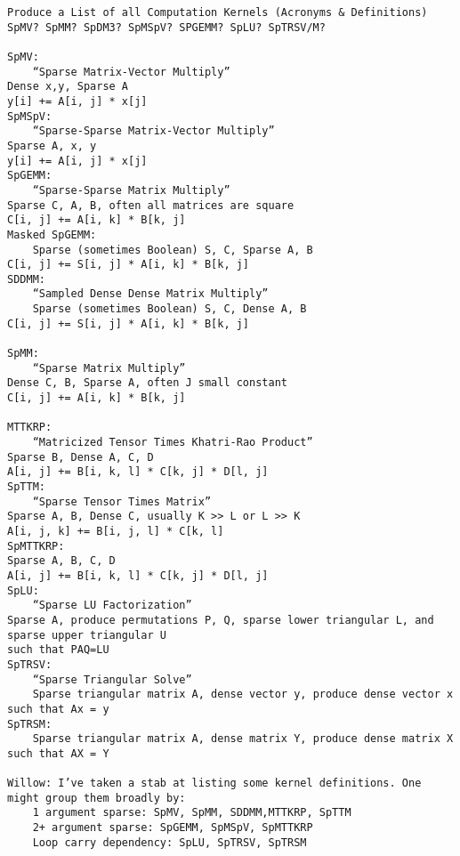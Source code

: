 \documentclass{article}
\begin{document}
\begin{verbatim}
Produce a List of all Computation Kernels (Acronyms & Definitions)
SpMV? SpMM? SpDM3? SpMSpV? SPGEMM? SpLU? SpTRSV/M?

SpMV:
	“Sparse Matrix-Vector Multiply”
Dense x,y, Sparse A
y[i] += A[i, j] * x[j]
SpMSpV:
	“Sparse-Sparse Matrix-Vector Multiply”
Sparse A, x, y
y[i] += A[i, j] * x[j]
SpGEMM:
	“Sparse-Sparse Matrix Multiply”
Sparse C, A, B, often all matrices are square
C[i, j] += A[i, k] * B[k, j]
Masked SpGEMM:
	Sparse (sometimes Boolean) S, C, Sparse A, B
C[i, j] += S[i, j] * A[i, k] * B[k, j]
SDDMM:
	“Sampled Dense Dense Matrix Multiply”
	Sparse (sometimes Boolean) S, C, Dense A, B
C[i, j] += S[i, j] * A[i, k] * B[k, j]

SpMM:
	“Sparse Matrix Multiply”
Dense C, B, Sparse A, often J small constant
C[i, j] += A[i, k] * B[k, j]

MTTKRP:
	“Matricized Tensor Times Khatri-Rao Product”
Sparse B, Dense A, C, D
A[i, j] += B[i, k, l] * C[k, j] * D[l, j]
SpTTM:
	“Sparse Tensor Times Matrix”
Sparse A, B, Dense C, usually K >> L or L >> K
A[i, j, k] += B[i, j, l] * C[k, l]
SpMTTKRP:
Sparse A, B, C, D
A[i, j] += B[i, k, l] * C[k, j] * D[l, j]
SpLU:
	“Sparse LU Factorization”
Sparse A, produce permutations P, Q, sparse lower triangular L, and sparse upper triangular U
such that PAQ=LU
SpTRSV:
	“Sparse Triangular Solve”
	Sparse triangular matrix A, dense vector y, produce dense vector x such that Ax = y
SpTRSM:
	Sparse triangular matrix A, dense matrix Y, produce dense matrix X such that AX = Y

Willow: I’ve taken a stab at listing some kernel definitions. One might group them broadly by:
	1 argument sparse: SpMV, SpMM, SDDMM,MTTKRP, SpTTM
	2+ argument sparse: SpGEMM, SpMSpV, SpMTTKRP
	Loop carry dependency: SpLU, SpTRSV, SpTRSM
\end{verbatim}

	
\end{document}
